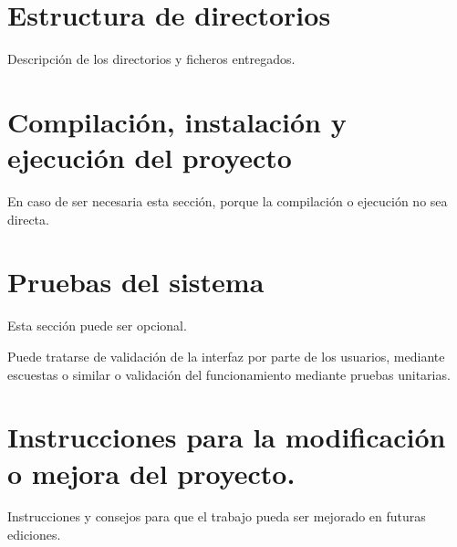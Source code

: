 
\section{Estructura de directorios}

Descripción de los directorios y ficheros entregados.

\section{Compilación, instalación y ejecución del proyecto}

En caso de ser necesaria esta sección, porque la compilación o ejecución no sea directa.


\section{Pruebas del sistema}
Esta sección puede ser opcional.

Puede tratarse de validación de la interfaz por parte de los usuarios, mediante escuestas o similar o validación del funcionamiento mediante pruebas unitarias.



\section{Instrucciones para la modificación o mejora del proyecto.}

Instrucciones y consejos para que el trabajo pueda ser mejorado en futuras ediciones.